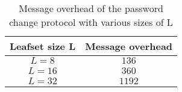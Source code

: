 
\begin{table}
  \centering
  \footnotesize
  \begin{tabular}{|c|c|}
    \hline
     \textbf{Leafset size L} & \textbf{Message overhead}\\
    \hline
      $L = 8$ & $136$\\
    \hline
      $L = 16$ & $360$\\
    \hline
      $L = 32$ & $1192$\\
    \hline
  \end{tabular}
  \caption{Message overhead of the password change protocol with various sizes of L}
  \label{tab:password_change_messages}
\end{table}

